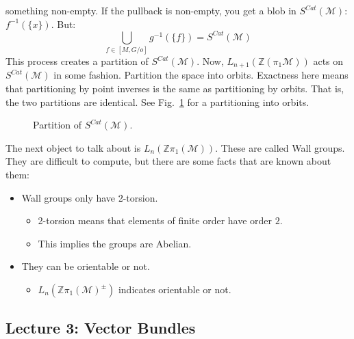             something non-empty. If the pullback is non-empty, you get a blob
            in $S^{Cat}(\mathcal{M})$: $f^{-1}(\{x\})$. But:
            \begin{equation}
                \bigcup_{f\in[M,G/o]}g^{-1}(\{f\})=S^{Cat}(\mathcal{M})
            \end{equation}
            This process creates a partition of $S^{Cat}(\mathcal{M})$. Now,
            $L_{n+1}(\mathbb{Z}(\pi_{1}\mathcal{M}))$ acts on
            $S^{Cat}(\mathcal{M})$ in some fashion. Partition the space into
            orbits. Exactness here means that partitioning by point inverses
            is the same as partitioning by orbits. That is, the two partitions
            are identical. See Fig.~\ref{fig:surgery_theory_partition_of_S_Cat}
            for a partitioning into orbits.
            \newpage
            \begin{figure}[H]
                \centering
                \captionsetup{type=figure}
                
                \caption{Partition of $S^{Cat}(\mathcal{M})$.}
                \label{fig:surgery_theory_partition_of_S_Cat}
            \end{figure}
            The next object to talk about is
            $L_{n}(\mathbb{Z}\pi_{1}(\mathcal{M}))$.
            These are called Wall groups. They are difficult to compute,
            but there are some facts that are known about them:
            \begin{itemize}
                \item Wall groups only have 2-torsion.
                \begin{itemize}
                    \item 2-torsion means that elements
                          of finite order have order $2$.
                    \item This implies the groups are Abelian.
                \end{itemize}
                \item They can be orientable or not.
                \begin{itemize}
                    \item $L_{n}(\mathbb{Z}\pi_{1}(\mathcal{M})^{\pm})$
                           indicates orientable or not.
                \end{itemize}
            \end{itemize}
    \subsection{Lecture 3: Vector Bundles}
